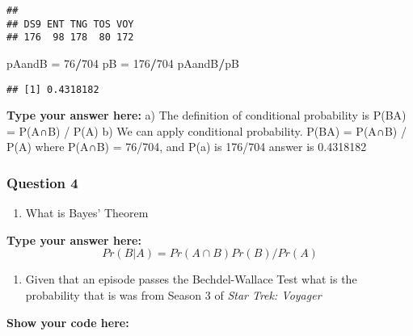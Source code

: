 \documentclass[
]{article}
\newenvironment{Shaded}{\begin{snugshade}}{\end{snugshade}}
\newcommand{\CommentTok}[1]{\textcolor[rgb]{0.56,0.35,0.01}{\textit{#1}}}
\newcommand{\DecValTok}[1]{\textcolor[rgb]{0.00,0.00,0.81}{#1}}
\newcommand{\KeywordTok}[1]{\textcolor[rgb]{0.13,0.29,0.53}{\textbf{#1}}}
\newcommand{\NormalTok}[1]{#1}
\newcommand{\OperatorTok}[1]{\textcolor[rgb]{0.81,0.36,0.00}{\textbf{#1}}}
\newcommand{\StringTok}[1]{\textcolor[rgb]{0.31,0.60,0.02}{#1}}
\providecommand{\tightlist}{%
  \setlength{\itemsep}{0pt}\setlength{\parskip}{0pt}}
\begin{document}
\begin{verbatim}
## 
## DS9 ENT TNG TOS VOY 
## 176  98 178  80 172
\end{verbatim}

\begin{Shaded}
\begin{Highlighting}[]
\NormalTok{pAandB =}\StringTok{ }\DecValTok{76}\OperatorTok{/}\DecValTok{704}
\NormalTok{pB =}\StringTok{ }\DecValTok{176}\OperatorTok{/}\DecValTok{704}
\NormalTok{pAandB}\OperatorTok{/}\NormalTok{pB}
\end{Highlighting}
\end{Shaded}

\begin{verbatim}
## [1] 0.4318182
\end{verbatim}

\textbf{Type your answer here:} a) The definition of conditional
probability is P(B\textbar A) = P(A∩B) / P(A) b) We can apply
conditional probability. P(B\textbar A) = P(A∩B) / P(A) where P(A∩B) =
76/704, and P(a) is 176/704 answer is 0.4318182

\hypertarget{question-4}{%
\subsubsection{Question 4}\label{question-4}}

\begin{enumerate}
\def\labelenumi{\alph{enumi}.}
\tightlist
\item
  What is Bayes' Theorem
\end{enumerate}

\textbf{Type your answer here:} \[
Pr(B|A) = Pr(A∩B)Pr(B)/Pr(A)
\]

\begin{enumerate}
\def\labelenumi{\alph{enumi}.}
\setcounter{enumi}{1}
\tightlist
\item
  Given that an episode passes the Bechdel-Wallace Test what is the
  probability that is was from Season 3 of \emph{Star Trek: Voyager}
\end{enumerate}

\textbf{Show your code here:}

\begin{Shaded}
\end{Shaded}
\end{document}
